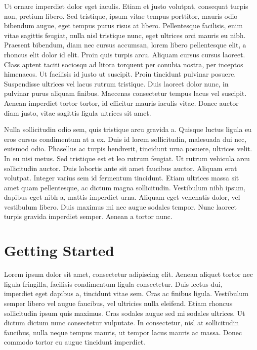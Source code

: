 \documentclass[letterpaper,10pt,english]{sphinxmanual}
\begin{document}
Ut ornare imperdiet dolor eget iaculis. Etiam et justo volutpat, consequat turpis non, pretium libero. Sed tristique, ipsum vitae tempus porttitor, mauris odio bibendum augue, eget tempus purus risus at libero. Pellentesque facilisis, enim vitae sagittis feugiat, nulla nisl tristique nunc, eget ultrices orci mauris eu nibh. Praesent bibendum, diam nec cursus accumsan, lorem libero pellentesque elit, a rhoncus elit dolor id elit. Proin quis turpis arcu. Aliquam cursus cursus laoreet. Class aptent taciti sociosqu ad litora torquent per conubia nostra, per inceptos himenaeos. Ut facilisis id justo ut suscipit. Proin tincidunt pulvinar posuere. Suspendisse ultrices vel lacus rutrum tristique. Duis laoreet dolor nunc, in pulvinar purus aliquam finibus. Maecenas consectetur tempus lacus vel suscipit. Aenean imperdiet tortor tortor, id efficitur mauris iaculis vitae. Donec auctor diam justo, vitae sagittis ligula ultrices sit amet.

Nulla sollicitudin odio sem, quis tristique arcu gravida a. Quisque luctus ligula eu eros cursus condimentum at a ex. Duis id lorem sollicitudin, malesuada dui nec, euismod odio. Phasellus ac turpis hendrerit, tincidunt urna posuere, ultrices velit. In eu nisi metus. Sed tristique est et leo rutrum feugiat. Ut rutrum vehicula arcu sollicitudin auctor. Duis lobortis ante sit amet faucibus auctor. Aliquam erat volutpat. Integer varius sem id fermentum tincidunt. Etiam ultrices massa sit amet quam pellentesque, ac dictum magna sollicitudin. Vestibulum nibh ipsum, dapibus eget nibh a, mattis imperdiet urna. Aliquam eget venenatis dolor, vel vestibulum libero. Duis maximus mi nec augue sodales tempor. Nunc laoreet turpis gravida imperdiet semper. Aenean a tortor nunc.


\chapter{Getting Started}
\label{getting_started::doc}\label{getting_started:getting-started}
Lorem ipsum dolor sit amet, consectetur adipiscing elit. Aenean aliquet tortor nec ligula fringilla, facilisis condimentum ligula consectetur. Duis lectus dui, imperdiet eget dapibus a, tincidunt vitae sem. Cras ac finibus ligula. Vestibulum semper libero vel augue faucibus, vel ultricies nulla eleifend. Etiam rhoncus sollicitudin ipsum quis maximus. Cras sodales augue sed mi sodales ultrices. Ut dictum dictum nunc consectetur vulputate. In consectetur, nisl at sollicitudin faucibus, nulla neque tempus mauris, ut tempor lacus mauris ac massa. Donec commodo tortor eu augue tincidunt imperdiet.
\end{document}
